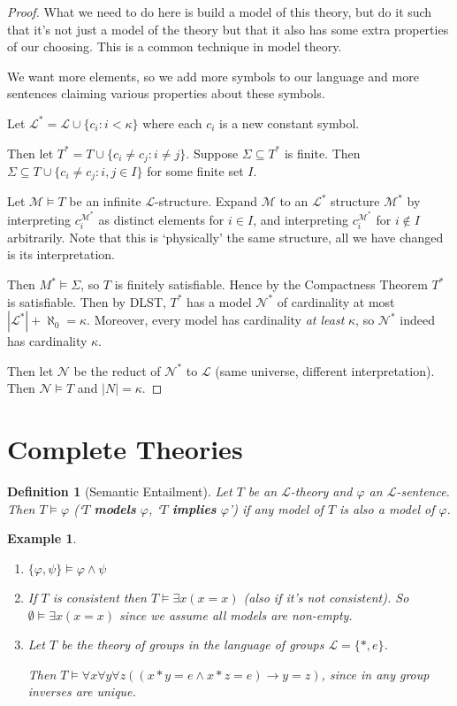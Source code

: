 \documentclass[]{article}
\theoremstyle{custhm}
\theoremstyle{cusdef}
\newtheorem{defin}[theorem]{Definition}
\theoremstyle{custhm}
\theoremstyle{custhm}
\theoremstyle{custhm}
\theoremstyle{ex}
\newtheorem{ex}[theorem]{Example}
\theoremstyle{custhm}
\theoremstyle{cusdef}
\theoremstyle{remark}
\theoremstyle{remark}
\newcommand{\ra}{\rightarrow}
\newcommand{\undf}[1]{\textit{\textbf{#1}}}
\renewcommand{\L}{\mathcal{L}}
\renewcommand{\it}[1]{\textit{#1}}
\newcommand{\M}{\mathcal{M}}
\renewcommand{\phi}{\varphi}
\renewcommand{\subset}{\subseteq}
\begin{document}
\begin{proof}
What we need to do here is build a model of this theory, but do it such that it's not just a model of the theory but that it also has some extra properties of our choosing. This is a common technique in model theory.

We want more elements, so we add more symbols to our language and more sentences claiming various properties about these symbols.

Let $\L^\ast = \L \cup \{c_i : i < \kappa\}$ where each $c_i$ is a new constant symbol.

Then let $T^\ast = T\cup \{c_i\ne c_j: i\ne j\}$. Suppose $\Sigma \subset T^\ast$ is finite. Then $\Sigma \subset T\cup\{c_i\ne c_j:i,j\in I\}$ for some finite set $I$.

Let $\M\models T$ be an infinite $\L$-structure. Expand $\M$ to an $\L^{\ast}$ structure $\M^\ast$ by interpreting $c_i^{\M^\ast}$ as distinct elements for $i\in I$, and interpreting $c_i^{\M^\ast}$ for $i\not\in I$ arbitrarily. Note that this is `physically' the same structure, all we have changed is its interpretation.

Then $M^{\ast}\models\Sigma$, so $T$ is finitely satisfiable. Hence by the Compactness Theorem $T^\ast$ is satisfiable. Then by DLST, $T^\ast$ has a model $\mathcal{N}^\ast$ of cardinality at most $|\L^\ast|+\aleph_0 = \kappa$. Moreover, every model has cardinality \it{at least} $\kappa$, so $\mathcal{N}^\ast$ indeed has cardinality $\kappa$.

Then let $\mathcal{N}$ be the reduct of $\mathcal{N}^\ast$ to $\L$ (same universe, different interpretation). Then $\mathcal{N}\models T$ and $|N| = \kappa$.
\end{proof}

\section*{Complete Theories}

\begin{defin}[Semantic Entailment]
Let $T$ be an $\L$-theory and $\phi$ an $\L$-sentence. Then $T\models \phi$ (`$T$ \undf{models} $\phi$, `$T$ \undf{implies} $\phi$') if any model of $T$ is also a model of $\phi$.
\end{defin}

\begin{ex}\ 
\begin{enumerate}[label=\arabic*)]
\item $\{\phi,\psi\}\models \phi\land\psi$
\item If $T$ is consistent then $T\models \exists x(x=x)$ (also if it's not consistent). So $\emptyset \models \exists x(x=x)$ since we assume all models are non-empty.
\item Let $T$ be the theory of groups in the language of groups $\L = \{\ast,e\}$.

Then $T\models \forall x\forall y\forall z\left((x\ast y = e\land x\ast z = e)\ra y=z\right)$, since in any group inverses are unique.
\end{enumerate}
\end{ex}
\end{document}
